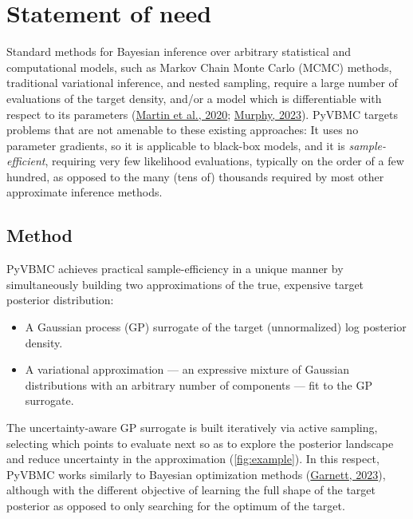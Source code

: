 \documentclass[
]{article}
\providecommand{\tightlist}{%
  \setlength{\itemsep}{0pt}\setlength{\parskip}{0pt}}
\begin{document}
\hypertarget{statement-of-need}{%
\section{Statement of need}\label{statement-of-need}}

Standard methods for Bayesian inference over arbitrary statistical and
computational models, such as Markov Chain Monte Carlo (MCMC) methods,
traditional variational inference, and nested sampling, require a large
number of evaluations of the target density, and/or a model which is
differentiable with respect to its parameters
(\protect\hyperlink{ref-martin_computing_2020}{Martin et al., 2020};
\protect\hyperlink{ref-murphy_probabilistic_2023}{Murphy, 2023}). PyVBMC
targets problems that are not amenable to these existing approaches: It
uses no parameter gradients, so it is applicable to black-box models,
and it is \emph{sample-efficient}, requiring very few likelihood
evaluations, typically on the order of a few hundred, as opposed to the
many (tens of) thousands required by most other approximate inference
methods.

\hypertarget{method}{%
\subsection{Method}\label{method}}

PyVBMC achieves practical sample-efficiency in a unique manner by
simultaneously building two approximations of the true, expensive target
posterior distribution:

\begin{itemize}
\tightlist
\item
  A Gaussian process (GP) surrogate of the target (unnormalized) log
  posterior density.
\item
  A variational approximation --- an expressive mixture of Gaussian
  distributions with an arbitrary number of components --- fit to the GP
  surrogate.
\end{itemize}

The uncertainty-aware GP surrogate is built iteratively via active
sampling, selecting which points to evaluate next so as to explore the
posterior landscape and reduce uncertainty in the approximation
(\autoref{fig:example}). In this respect, PyVBMC works similarly to
Bayesian optimization methods
(\protect\hyperlink{ref-garnett_bayesian_2023}{Garnett, 2023}), although
with the different objective of learning the full shape of the target
posterior as opposed to only searching for the optimum of the target.
\end{document}
